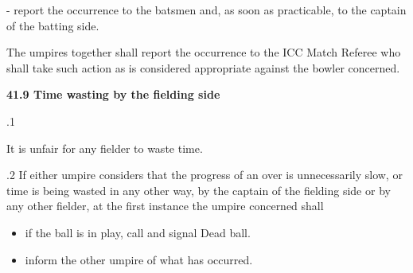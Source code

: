 \documentclass[12pt]{article}
\begin{document}
\vspace{\baselineskip}
{\fontsize{9pt}{10.8pt}\selectfont - report the occurrence to the batsmen and, as soon as practicable, to the captain of the batting side.\par}\par


\vspace{\baselineskip}
\begin{adjustwidth}{0.0in}{0.57in}
{\fontsize{9pt}{10.8pt}\selectfont The umpires together shall report the occurrence to the ICC Match Referee who shall take such action as is considered appropriate against the bowler concerned.\par}\par

\end{adjustwidth}


\vspace{\baselineskip}
{\fontsize{11pt}{13.2pt}\selectfont \textbf{41.9 \tabto{0.47in} Time wasting by the fielding side}\par}\par


\vspace{\baselineskip}
{\fontsize{9pt}{10.8pt}.1 \tabto{0.49in} {\fontsize{8pt}{9.6pt}\selectfont It is unfair for any fielder to waste time.\par}\par}\par


\vspace{\baselineskip}
\begin{adjustwidth}{0.5in}{0.11in}
{\fontsize{9pt}{10.8pt}.2 \tabto{0.49in} If either umpire considers that the progress of an over is unnecessarily slow, or time is being wasted in any other way, by the captain of the fielding side or by any other fielder, at the first instance the umpire concerned shall\par}\par

\end{adjustwidth}


\vspace{\baselineskip}
\begin{itemize}
	\item {\fontsize{9pt}{10.8pt}\selectfont if the ball is in play, call and signal Dead ball.\par}\par


\vspace{\baselineskip}
	\item {\fontsize{9pt}{10.8pt}\selectfont inform the other umpire of what has occurred.\par}
\end{itemize}\par
\end{document}
